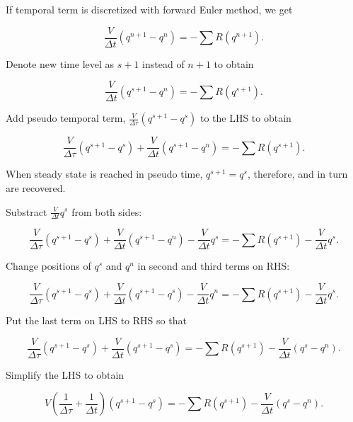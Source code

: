 \documentclass{report}
\begin{document}
If temporal term is discretized with forward Euler method, we get

\begin{equation}\label{eq:original}
    \frac{V}{\Delta t} (q^{n+1}-q^n) = -\sum R(q^{n+1}).
\end{equation}

Denote new time level as $s+1$ instead of $n+1$ to obtain

\begin{equation}\label{eq:denote}
    \frac{V}{\Delta t} (q^{s+1}-q^n) = -\sum R(q^{s+1}).
\end{equation}

Add pseudo temporal term, $\frac{V}{\Delta \tau} (q^{s+1}-q^s)$ to the LHS to obtain

\begin{equation}
    \frac{V}{\Delta \tau} (q^{s+1}-q^s) + \frac{V}{\Delta t} (q^{s+1}-q^n) = -\sum R(q^{s+1}).
\end{equation}

When steady state is reached in pseudo time, $q^{s+1}=q^s$, therefore,  and in turn  are recovered. 

Substract $\frac{V}{\Delta t} q^s$ from both sides:

\begin{equation}
    \frac{V}{\Delta \tau} (q^{s+1}-q^s) + \frac{V}{\Delta t} (q^{s+1}-q^n) - \frac{V}{\Delta t} q^s = -\sum R(q^{s+1}) - \frac{V}{\Delta t} q^s.
\end{equation}

Change positions of $q^s$ and $q^n$ in second and third terms on RHS:

\begin{equation}
    \frac{V}{\Delta \tau} (q^{s+1}-q^s) + \frac{V}{\Delta t} (q^{s+1}-q^s) - \frac{V}{\Delta t} q^n = -\sum R(q^{s+1}) - \frac{V}{\Delta t} q^s.
\end{equation}

Put the last term on LHS to RHS so that

\begin{equation}
    \frac{V}{\Delta \tau} (q^{s+1}-q^s) + \frac{V}{\Delta t} (q^{s+1}-q^s) = -\sum R(q^{s+1}) - \frac{V}{\Delta t} (q^s-q^n).
\end{equation}

Simplify the LHS to obtain

\begin{equation}
    \boxed
    {
        V\left(\frac{1}{\Delta \tau}+\frac{1}{\Delta t}\right)(q^{s+1}-q^s) = -\sum R(q^{s+1}) - \frac{V}{\Delta t} (q^s-q^n).
    }
\end{equation}
\end{document}
